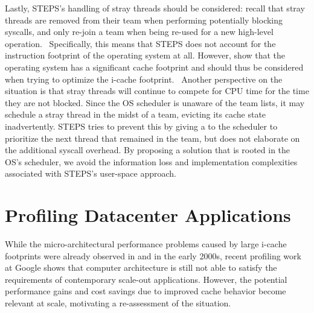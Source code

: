 \documentclass[12pt,a4paper]{book}
\begin{document}
Lastly, STEPS's handling of stray threads should be considered: recall that stray threads are removed from their team when performing potentially blocking syscalls, and only re-join a team when being re-used for a new high-level operation.~\cite{steps}
Specifically, this means that STEPS does not account for the instruction footprint of the operating system at all.
However, \citeauthor*{osCacheFootprint} show that the operating system has a significant cache footprint and should thus be considered when trying to optimize the i-cache footprint.~\cite{osCacheFootprint,compspr} %
Another perspective on the situation is that stray threads will continue to compete for CPU time for the time they are not blocked.
Since the OS scheduler is unaware of the team lists, it may schedule a stray thread in the midst of a team, evicting its cache state inadvertently.
STEPS tries to prevent this by giving a  to the scheduler to prioritize the next thread that remained in the team, but does not elaborate on the additional syscall overhead.
By proposing a solution that is rooted in the OS's scheduler, we avoid the information loss and implementation complexities associated with STEPS's user-space approach.

\section{Profiling Datacenter Applications}\label{ch:relwork:profiling}

While the micro-architectural performance problems caused by large i-cache footprints were already observed in \cite{cohort} and \cite{steps} in the early 2000s,
recent profiling work at Google shows that computer architecture is still not able to satisfy the requirements of contemporary scale-out applications.
However, the potential performance gains and cost savings due to improved cache behavior become relevant at scale, motivating a re-assessment of the situation.
\end{document}
